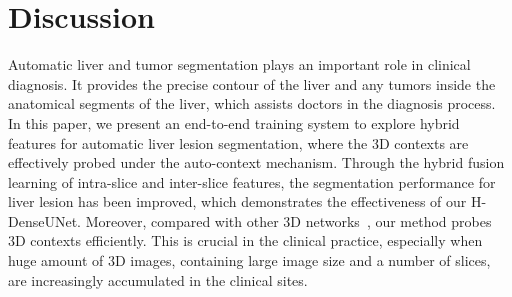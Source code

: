 \documentclass[journal]{IEEEtran}
\begin{document}
\section{Discussion}
Automatic liver and tumor segmentation plays an important role in clinical diagnosis. It provides the precise contour of the liver and any tumors inside the anatomical segments of the liver, which assists doctors in the diagnosis process. 
In this paper, we present an end-to-end training system to explore hybrid features for automatic liver lesion segmentation, where the 3D contexts are effectively probed under the auto-context mechanism.
Through the hybrid fusion learning of intra-slice and inter-slice features, the segmentation performance for liver lesion has been improved, which demonstrates the effectiveness of our H-DenseUNet.
Moreover, compared with other 3D networks~\cite{cciccek20163d,dou20163d}, our method probes 3D contexts efficiently. This is crucial in the clinical practice, especially when huge amount of 3D images, containing large image size and a number of slices, are increasingly accumulated in the clinical sites.

\end{document}
